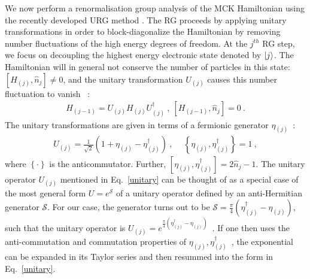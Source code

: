 \documentclass[reprint,prb,superscriptaddress]{revtex4-2}
\begin{document}
We now perform a renormalisation group analysis of the MCK Hamiltonian using the recently developed URG method \cite{anirbanmott1,anirbanmott2,anirbanurg1,anirbanurg2,siddharthacpi,santanukagome,1dhubjhep}.
The RG proceeds {by applying unitary transformations in order to block-diagonalize the Hamiltonian by removing number fluctuations of the high energy degrees of freedom}.
At the $j^{th}$ RG step, we focus on decoupling the highest energy electronic state denoted by $\ket{j}$.
The Hamiltonian will in general not conserve the number of particles in this state: \(\left[H_{(j)}, \hat n_{j}\right] \neq 0\), and the unitary transformation \(U_{(j)}\) causes this number fluctuation to vanish
~\cite{anirbanurg1,anirbanurg2}:
\begin{equation}\begin{aligned}
	H_{(j-1)} = U_{(j)} H_{(j)} U^\dagger_{(j)}~, ~\left[H_{(j-1)}, \hat n_{j}\right] =0~.
\end{aligned}\end{equation}
The unitary transformations are given in terms of a fermionic generator \(\eta_{(j)}\)~\cite{anirbanurg1,anirbanurg2}:
\begin{equation}\begin{aligned}
	\label{unitary}
	U_{(j)} = \frac{1}{\sqrt 2}\left(1 + \eta_{(j)} - \eta_{(j)}^\dagger\right)~,~ \quad\left\{ \eta_{(j)},\eta_{(j)}^\dagger \right\} = 1~,
\end{aligned}\end{equation}
where \(\left\{\cdot\right\}\) is the anticommutator. {\color{blue} Further, $\left[ \eta_{(j)},\eta_{(j)}^\dagger \right] = 2\hat n_{j}-1$. The unitary operator \(U_{(j)}\) mentioned in Eq.~\eqref{unitary} can be thought of as a special case of the most general form \(U = e^\mathcal{S}\) of a unitary operator defined by an anti-Hermitian generator \(\mathcal{S}\). For our case, the generator turns out to be \(\mathcal{S} = \frac{\pi}{4}\left( \eta^\dagger_{(j)} - \eta_{(j)} \right) \), such that the unitary operator is \(U_{(j)} = e^{\frac{\pi}{4}\left(\eta^\dagger_{(j)} - \eta_{(j)}\right) }\)~\cite{anirbanurg1}. If one then uses the anti-commutation and commutation properties of \(\eta_{(j)},\eta^\dagger_{(j)}\)~\cite{anirbanurg1,anirbanurg2}, the exponential can be expanded in its Taylor series and then resummed into the form in Eq.~\eqref{unitary}.}
\end{document}
